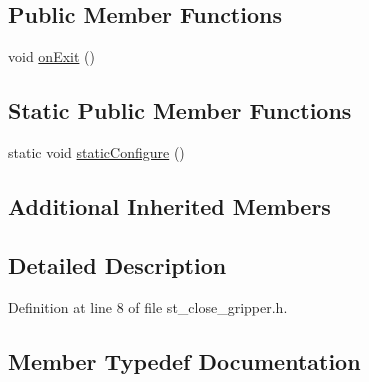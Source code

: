 \subsection*{Public Member Functions}
\begin{DoxyCompactItemize}
\item 
void \hyperlink{structsm__fetch__two__table__pick__n__place__1_1_1pick__states_1_1StCloseGripper_adce3130d68e84e5432884872170e789f}{on\+Exit} ()
\end{DoxyCompactItemize}
\subsection*{Static Public Member Functions}
\begin{DoxyCompactItemize}
\item 
static void \hyperlink{structsm__fetch__two__table__pick__n__place__1_1_1pick__states_1_1StCloseGripper_abeb0ec2de7ddc46d2aa39c9050ad57b6}{static\+Configure} ()
\end{DoxyCompactItemize}
\subsection*{Additional Inherited Members}


\subsection{Detailed Description}


Definition at line 8 of file st\+\_\+close\+\_\+gripper.\+h.



\subsection{Member Typedef Documentation}
\mbox{\label{structsm__fetch__two__table__pick__n__place__1_1_1pick__states_1_1StCloseGripper_a767854cf0c9c0e8489cbae35c8e21b9f}} 
